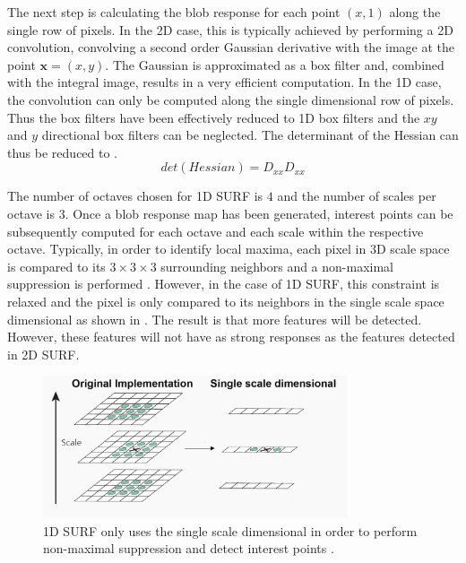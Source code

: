 \documentclass[11pt]{report}
\begin{document}
The next step is calculating the blob response for each point $(x,1)$ along the single row of pixels. In the 2D case, this is typically achieved by performing a 2D convolution, convolving a second order Gaussian derivative with the image at the point $\textbf{x} = (x,y)$. The Gaussian is approximated as a box filter and, combined with the integral image, results in a very efficient computation. In the 1D case, the convolution can only be computed along the single dimensional row of pixels. Thus the box filters have been effectively reduced to 1D box filters and the $xy$ and $y$ directional box filters can be neglected. The determinant of the Hessian can thus be reduced to .\\

\begin{equation}
det(Hessian) = D_{xx}D_{xx}
\label{eqn:reducedHessian}
\end{equation} 

The number of octaves chosen for 1D SURF is $4$ and the number of scales per octave is $3$. Once a blob response map has been generated, interest points can be subsequently computed for each octave and each scale within the respective octave. Typically, in order to identify local maxima, each pixel in 3D scale space is compared to its $3 \times 3 \times 3$ surrounding neighbors and a non-maximal suppression is performed \cite{Evans2009}. However, in the case of 1D SURF, this constraint is relaxed and the pixel is only compared to its neighbors in the single scale space dimensional as shown in  \cite{Anderson}. The result is that more features will be detected. However, these features will not have as strong responses as the features detected in 2D SURF.\\

\begin{figure}[h!] 
  \centering
    \includegraphics[width=0.8\textwidth]{../Drawings/methods/SURF1D_Nonmaximal_suppression.jpg}
    \caption{1D SURF only uses the single scale dimensional in order to perform non-maximal suppression and detect interest points \cite{Anderson}.}
    \label{fig:singleScale}
\end{figure}
\end{document}
